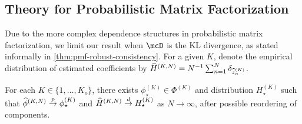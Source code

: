 \subsection{Theory for Probabilistic Matrix Factorization}

Due to the more complex dependence structures in probabilistic matrix factorization, we limit 
our result when $\mcD$ is the KL divergence, as stated informally in \cref{thm:pmf-robust-consistency}. 
For a given $K$, denote the empirical distribution of estimated coefficients by $\widehat{H}^{(K,N)} = N^{-1}\sum^{N}_{n=1}\delta_{\widehat{z}^{(K)}_{n}}$.
\begin{assumption}\label{assump:consistency}
	For each $K \in \{1,\dots,K_{o}\}$, there exists ${\phi}^{(K)}_{\star} \in\Phi^{(K)}$ and distribution $H^{(K)}_{\star}$ such that ${\widehat{\phi}}^{(K,N)} \overset{p}{\to} {\phi}^{(K)}_{\star}$ and $\widehat{H}^{(K,N)}\overset{d}{\to} H^{(K)}_{\star}$ as $N\to \infty$, after possible reordering of components.
\end{assumption}

